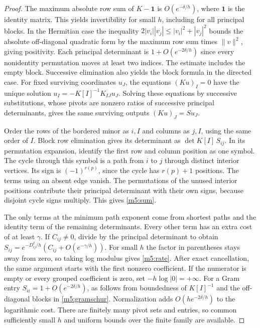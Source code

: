 \documentclass[11pt,reqno]{amsart}
\theoremstyle{definition}
\theoremstyle{remark}
\numberwithin{equation}{section}
\begin{document}
\begin{proof}
The maximum absolute row sum of \(K-\mathbf 1\) is \(O(e^{-\delta/h})\),
where \(\mathbf 1\) is the identity matrix. This yields invertibility
for small \(h\), including for all principal blocks. In the Hermitian
case the inequality \(2|v_i||v_j|\le |v_i|^2+|v_j|^2\) bounds the
absolute off-diagonal quadratic form by the maximum row sum times
\(\lVert v\rVert^2\), giving positivity. Each principal determinant
is \(1+O(e^{-2\delta/h})\) since every nonidentity permutation moves
at least two indices. The estimate includes the empty block.
Successive elimination also yields the block formula in the directed
case. For fixed surviving coordinates \(u_J\), the equations
\((Ku)_I=0\) have the unique solution
\(u_I=-K[I]^{-1}K_{IJ}u_J\). Solving these equations by successive
substitutions, whose pivots are nonzero ratios of successive principal
determinants, gives the same surviving outputs \((Ku)_J=S u_J\).

Order the rows of the bordered minor as \(i,I\) and columns as \(j,I\),
using the same order of \(I\). Block row elimination gives its
determinant as \(\det K[I]\,S_{ij}\). In its permutation expansion,
identify the first row and column position as one symbol. The cycle
through this symbol is a path from \(i\) to \(j\) through distinct
interior vertices. Its sign is \((-1)^{r(p)}\), since the cycle has
\(r(p)+1\) positions. The terms using an absent edge vanish. The
permutations of the unused interior positions contribute their
principal determinant with their own signs, because disjoint cycle
signs multiply. This gives \eqref{m5:sum}.

The only terms at the minimum path exponent come from shortest paths
and the identity term of the remaining determinants. Every other
term has an extra cost of at least \(\gamma\). If \(C_{ij}\ne0\),
divide by the principal determinant to obtain
\(S_{ij}=e^{-D^I_{ij}/h}(C_{ij}+O(e^{-\gamma/h}))\).
For small \(h\) the factor in parentheses stays away from zero,
so taking log modulus gives \eqref{m5:rate}. After exact cancellation,
the same argument starts with the first nonzero coefficient. If
the numerator is empty or every grouped coefficient is zero, set
\(-h\log|0|=+\infty\). For a Gram entry \(S_{ii}=1+O(e^{-2\delta/h})\),
as follows from boundedness of \(K[I]^{-1}\) and the off-diagonal
blocks in \eqref{m5:gramschur}. Normalization adds \(O(h e^{-2\delta/h})\)
to the logarithmic cost. There are finitely many pivot sets and entries,
so common sufficiently small \(h\) and uniform bounds over the
finite family are available.
\end{proof}
\end{document}
